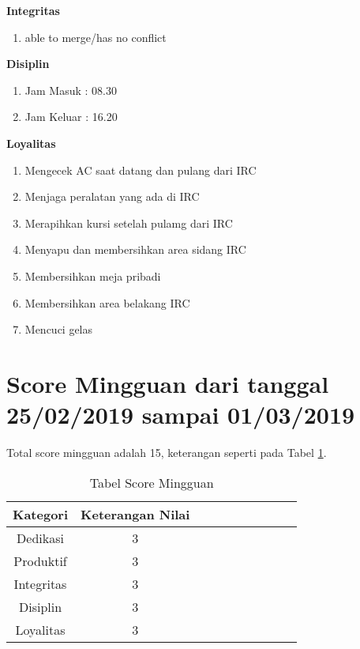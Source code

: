 \begin{enumerate}
\textbf{Integritas}
\begin{enumerate}
\item able to merge/has no conflict
\end{enumerate}

\textbf{Disiplin}
\begin{enumerate}
\item Jam Masuk : 08.30
\item Jam Keluar : 16.20
\end{enumerate}

\textbf{Loyalitas}
\begin{enumerate}
\item Mengecek AC saat datang dan pulang dari IRC
\item Menjaga peralatan yang ada di IRC
\item Merapihkan kursi setelah pulamg dari IRC
\item Menyapu dan membersihkan area sidang IRC
\item Membersihkan meja pribadi
\item Membersihkan area belakang IRC
\item Mencuci gelas
\end{enumerate}
\end{enumerate}


\section{Score Mingguan dari tanggal 25/02/2019 sampai 01/03/2019}
Total score mingguan adalah 15, keterangan seperti pada Tabel \ref{table:scoremingguan}.
\begin{table}[!ht]
\centering
\begin{tabular}{ |c|c|c|c|c|c|c|c|c|c| }
\hline
Kategori & Keterangan Nilai \\
\hline
Dedikasi & 3 \\
\hline
Produktif & 3 \\
\hline
Integritas & 3 \\
\hline
Disiplin & 3 \\
\hline
Loyalitas & 3 \\
\hline
\end{tabular}
\caption{Tabel Score Mingguan}
\label{table:scoremingguan}
\end{table}

